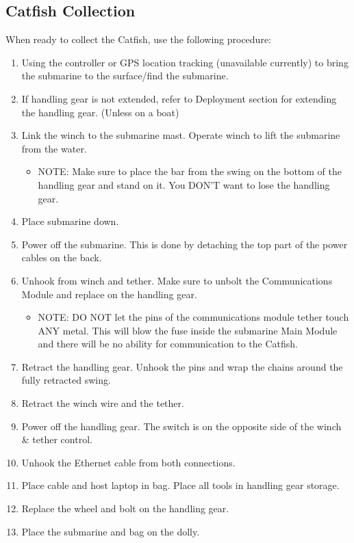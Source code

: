 \documentclass[
18pt, %
a4paper, %
oneside, %
headinclude,footinclude, %
]{scrartcl}
\begin{document}

\subsection{Catfish Collection}

When ready to collect the Catfish, use the following procedure:

\begin{enumerate}
	\item Using the controller or GPS location tracking (unavailable currently) to bring the submarine to the surface/find the submarine.
	\item If handling gear is not extended, refer to Deployment section for extending the handling gear. (Unless on a boat)
	\item Link the winch to the submarine mast. Operate winch to lift the submarine from the water.
		\begin{itemize}
			\item NOTE: Make sure to place the bar from the swing on the bottom of the handling gear and stand on it. You DON'T want to lose the handling gear.
		\end{itemize}
	\item Place submarine down. 
	\item Power off the submarine. This is done by detaching the top part of the power cables on the back.
	\item Unhook from winch and tether. Make sure to unbolt the Communications Module and replace on the handling gear.
		\begin{itemize}
			\item NOTE: DO NOT let the pins of the communications module tether touch ANY metal. This will blow the fuse inside the submarine Main Module and there will be no ability for communication to the Catfish.
		\end{itemize}
	\item Retract the handling gear. Unhook the pins and wrap the chains around the fully retracted swing. 
	\item Retract the winch wire and the tether.
	\item Power off the handling gear. The switch is on the opposite side of the winch \& tether control.
	\item Unhook the Ethernet cable from both connections. 
	\item Place cable and host laptop in bag. Place all tools in handling gear storage.
	\item Replace the wheel and bolt on the handling gear.
	\item Place the submarine and bag on the dolly.
\end{enumerate}
\end{document}
